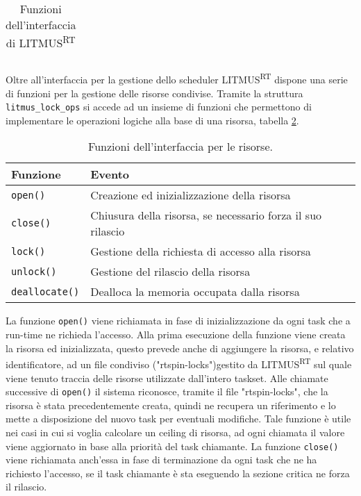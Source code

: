 \begin{appendices}
\begin{table}
\begin{tabular}{|ll|}
  	\hline
  	\end{tabular}
  \caption{Funzioni dell'interfaccia di LITMUS\textsuperscript{RT}}
  \label{tab:functions}
\end{table}

\noindent Oltre all'interfaccia per la gestione dello scheduler LITMUS\textsuperscript{RT} dispone una serie di funzioni per la gestione delle risorse condivise. Tramite la struttura \texttt{litmus\_lock\_ops} si accede ad un insieme di funzioni che permettono di implementare le operazioni logiche alla base di una risorsa, tabella \ref{tab:functions_resource}.\\

\begin{table}
  \centering
  \begin{tabular}{|ll|}
	\hline
	    Funzione & Evento \\ \hline \hline
	   
\texttt{open()}			& Creazione ed inizializzazione della risorsa \\
\texttt{close()}		& Chiusura della risorsa, se necessario forza il suo rilascio \\
\texttt{lock()}			& Gestione della richiesta di accesso alla risorsa \\
\texttt{unlock()}		& Gestione del rilascio della risorsa \\
\texttt{deallocate()}	& Dealloca la memoria occupata dalla risorsa \\

  	\hline
  	\end{tabular}
  \caption{Funzioni dell'interfaccia per le risorse.}
  \label{tab:functions_resource}
\end{table}

\noindent La funzione \texttt{open()} viene richiamata in fase di inizializzazione da ogni task che a run-time ne richieda l'accesso. Alla prima esecuzione della funzione viene creata la risorsa ed inizializzata, questo prevede anche di aggiungere la risorsa, e relativo identificatore, ad un file condiviso ("rtspin-locks")gestito da LITMUS\textsuperscript{RT} sul quale viene tenuto traccia delle risorse utilizzate dall'intero taskset. Alle chiamate successive di \texttt{open()} il sistema riconosce, tramite il file "rtspin-locks", che la risorsa è stata precedentemente creata, quindi ne recupera un riferimento e lo mette a disposizione del nuovo task per eventuali modifiche. Tale funzione è utile nei casi in cui si voglia calcolare un ceiling di risorsa, ad ogni chiamata il valore viene aggiornato in base alla priorità del task chiamante. La funzione \texttt{close()} viene richiamata anch'essa in fase di terminazione da ogni task che ne ha richiesto l'accesso, se il task chiamante è sta eseguendo la sezione critica ne forza il rilascio.\\


\end{appendices}
